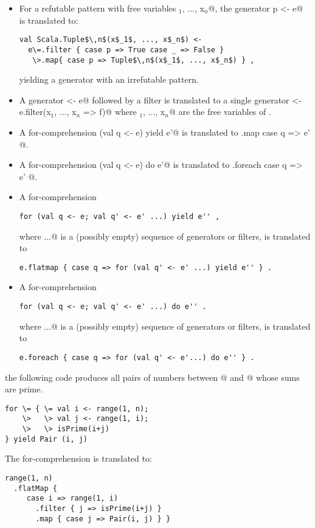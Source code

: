 \documentclass[11pt]{report}
\begin{document}
\begin{itemize}
\item
For a refutable pattern \verb@p@ with free variables
\verb@x$_1$, ..., x$_n$@, 
the generator \verb@val p <- e@ is translated to:
\begin{verbatim}
val Scala.Tuple$\,n$(x$_1$, ..., x$_n$) <- 
  e\=.filter { case p => True case _ => False }
   \>.map{ case p => Tuple$\,n$(x$_1$, ..., x$_n$) } ,
\end{verbatim}
yielding a generator with an irrefutable pattern.

\item
A generator \verb@q <- e@ followed by a filter \verb@f@ is translated to
a single generator \verb@q <- e.filter(x$_1$, ..., x$_n$ => f)@ where
\verb@x$_1$, ..., x$_n$@ are the free variables of \verb@q@.

\item
A for-comprehension 
\verb@for (val q <- e) yield e'@
is translated to
\verb@e.map { case q => e' }@.

\item
A for-comprehension
\verb@for (val q <- e) do e'@
is translated to
\verb@e.foreach { case q => e' }@.

\item
A for-comprehension
\begin{verbatim}
for (val q <- e; val q' <- e' ...) yield e'' ,
\end{verbatim}
where \verb@...@ is a (possibly empty)
sequence of generators or filters,
is translated to
\begin{verbatim}
e.flatmap { case q => for (val q' <- e' ...) yield e'' } .
\end{verbatim}
\item
A for-comprehension
\begin{verbatim}
for (val q <- e; val q' <- e' ...) do e'' .
\end{verbatim}
where \verb@...@ is a (possibly empty)
sequence of generators or filters,
is translated to
\begin{verbatim}
e.foreach { case q => for (val q' <- e'...) do e'' } .
\end{verbatim}
\end{itemize}

\example
the following code produces all pairs of numbers
between @ and @ whose sums are prime.
\begin{verbatim}
for \= { \= val i <- range(1, n);
    \>   \> val j <- range(1, i);
    \>   \> isPrime(i+j)
} yield Pair (i, j)
\end{verbatim}
The for-comprehension is translated to:
\begin{verbatim}
range(1, n)
  .flatMap {
     case i => range(1, i)
       .filter { j => isPrime(i+j) }
       .map { case j => Pair(i, j) } }
\end{verbatim}
\end{document}
